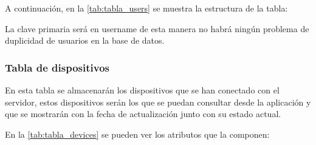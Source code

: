 A continuación, en la \autoref{tab:tabla_users} se muestra la estructura de la tabla:
\begin{table}[H]
	\centering
	\caption{Estructura tabla users}
	\label{tab:tabla_users}
\end{table}
La clave primaria será en username de esta manera no habrá ningún problema de duplicidad de usuarios en la base de datos.

\subsubsection{Tabla de dispositivos}
En esta tabla se almacenarán los dispositivos que se han conectado con el servidor, estos dispositivos serán los que se puedan consultar desde la aplicación y que se mostrarán con la fecha de actualización junto con su estado actual.

En la \autoref{tab:tabla_devices} se pueden ver los atributos que la componen:

